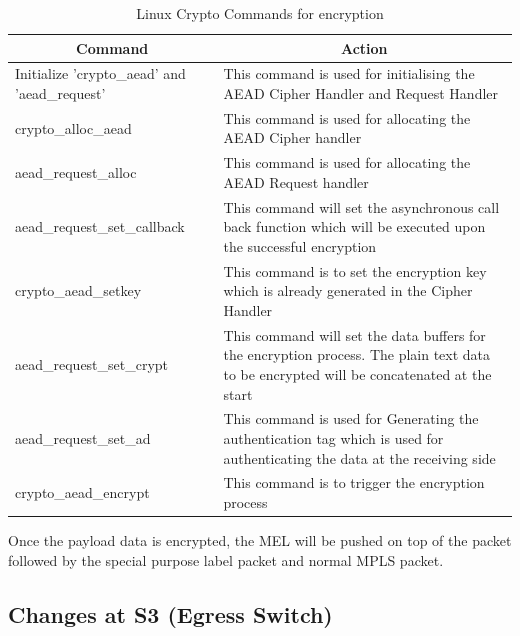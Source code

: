 \begin{table}[ht]
  \centering
  \caption{Linux Crypto Commands for encryption}
    \begin{tabular}{|l|l|}
    \toprule
    \hline
    \multicolumn{1}{|c|}{Command} & \multicolumn{1}{c|}{Action} \\
    \hline
    \midrule
    \multicolumn{1}{|p{15.89em}|}{Initialize ’crypto\_aead’ and ’aead\_request’} & \multicolumn{1}{p{22.5em}|}{This command is used for initialising the AEAD Cipher Handler and Request Handler} \\
    \hline
    \midrule
    crypto\_alloc\_aead & \multicolumn{1}{p{22.5em}|}{This command is used for allocating the AEAD Cipher handler} \\
    \hline
    \midrule
    aead\_request\_alloc & \multicolumn{1}{p{22.5em}|}{This command is used for allocating the AEAD Request handler} \\
    \hline
    \midrule
    aead\_request\_set\_callback & \multicolumn{1}{p{22.5em}|}{This command will set the asynchronous call back function which will be executed upon the successful encryption} \\
    \hline
    \midrule
    crypto\_aead\_setkey & \multicolumn{1}{p{22.5em}|}{This command is to set the encryption key which is already generated in the Cipher Handler} \\
    \hline
    \midrule
    aead\_request\_set\_crypt & \multicolumn{1}{p{22.5em}|}{This command will set the data buffers for the encryption process. The plain text data to be encrypted will be concatenated at the start} \\
    \hline
    \midrule
    aead\_request\_set\_ad & \multicolumn{1}{p{22.5em}|}{This command is used for Generating the authentication tag which is used for authenticating the data at the receiving side} \\
    \hline
    \midrule
    crypto\_aead\_encrypt & This command is to trigger the encryption process \\
    \hline
    \bottomrule
    \end{tabular}%
  \label{tab:addlabel}%
\end{table}%




Once the payload data is encrypted, the MEL will be pushed on top of the packet followed by the special purpose label packet and normal MPLS packet. 

\subsection{Changes at S3 (Egress Switch)}
 


